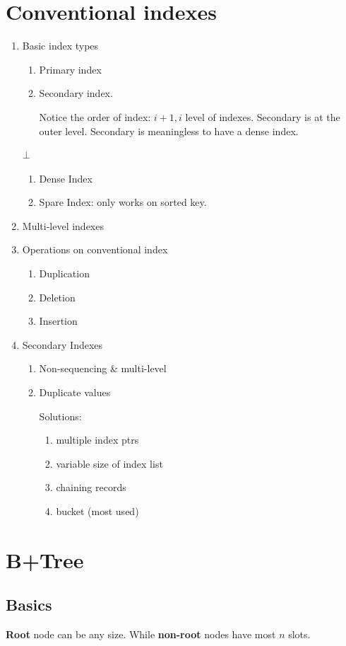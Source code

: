 \documentclass[a4paper]{report}
\begin{document}
\section{Conventional indexes}
\begin{enumerate}
\item Basic index types
  \begin{enumerate}
  \item Primary index
  \item Secondary index.

  Notice the order of index: $i+1, i$ level of indexes. Secondary is at the outer level. Secondary is meaningless to have a dense index.



  \end{enumerate}
  $\bot$
  \begin{enumerate}
  \item Dense Index
  \item Spare Index: only works on sorted key.
  \end{enumerate}
\item Multi-level indexes
\item Operations on conventional index
  \begin{enumerate}
  \item Duplication
  \item Deletion
  \item Insertion
  \end{enumerate}
\item Secondary Indexes
  \begin{enumerate}
  \item Non-sequencing \& multi-level
  \item Duplicate values

  Solutions:
    \begin{enumerate}
    \item multiple index ptrs
    \item variable size of index list
    \item chaining records
    \item bucket (most used)
    \end{enumerate}
  \end{enumerate}
\end{enumerate}
\section{B+Tree}
\subsection{Basics}
\textbf{Root} node can be any size. While \textbf{non-root} nodes have most $n$ slots.
\end{document}
